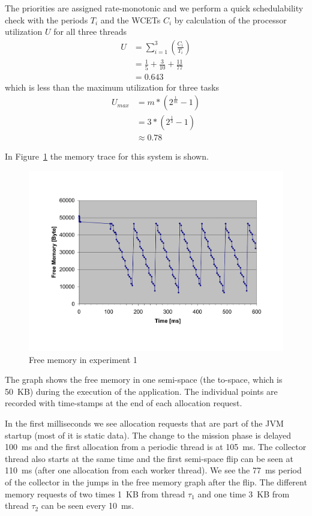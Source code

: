 The priorities are assigned rate-monotonic \cite{321743} and we
perform a quick schedulability check with the periods $T_i$ and the
WCETs $C_i$ by calculation of the processor utilization $U$ for all
three threads
\begin{align*}
    U & = \sum_{i=1}^{3}\left(\frac{C_i}{T_i}\right)\\
      & = \frac{1}{5} + \frac{3}{10} + \frac{11}{77}\\
      & = 0.643
\end{align*}
which is less than the maximum utilization for three tasks
\begin{align*}
    U_{max} & = m*(2^{\frac{1}{m}}-1)\\
      & = 3*(2^{\frac{1}{3}}-1)\\
      & \approx 0.78
\end{align*}

In Figure~\ref{fig:ex1:mem} the memory trace for this system is
shown.
\begin{figure}
\begin{center}
    \includegraphics[width=\excelwidth]{jvm/gc_ex1}
    \caption{Free memory in experiment 1}
\label{fig:ex1:mem}
\end{center}
\end{figure}
The graph shows the free memory in one semi-space (the to-space,
which is 50~KB) during the execution of the application. The
individual points are recorded with time-stamps at the end of each
allocation request.

In the first milliseconds we see allocation requests that are part
of the JVM startup (most of it is static data). The change to the
mission phase is delayed 100~ms and the first allocation from a
periodic thread is at 105~ms. The collector thread also starts at
the same time and the first semi-space flip can be seen at 110~ms
(after one allocation from each worker thread). We see the 77~ms
period of the collector in the jumps in the free memory graph after
the flip. The different memory requests of two times 1~KB from
thread $\tau_1$ and one time 3~KB from thread $\tau_2$ can be seen
every 10~ms.

